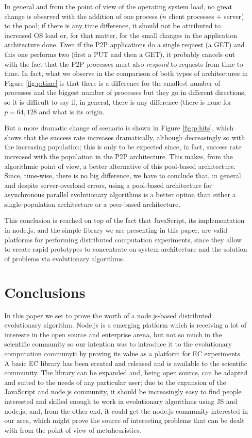 \documentclass{sig-alternate}
\begin{document}
In general and from the point of view of the operating system load, no
great change is observed with the addition of one process ($n$ client
processes + server) to the pool; if there is any time difference, it
should not be attributed to increased OS load or, for that matter, for
the small changes in the application architecture done. Even if the
P2P applications do a single request (a GET) and this one performs two
(first a PUT and then a GET), it probably cancels out with the fact
that the P2P processes must also {\em respond} to requests from time
to time. In fact, what we observe in the comparison of both types of
architectures in Figure \ref{fig:p:time} is that there is a difference
for the smallest number of processes and the biggest number of
processes but they go in different directions, so it is difficult to
say if, in general, there is any difference (there is none for
$p=64,128$ and what is its origin. 

But a more dramatic change of scenario is shown in Figure
\ref{fig:p:hits}, which shows that the success rate increases
dramatically, although decreasingly so with the increasing population;
this is only to be expected since, in fact, success rate increased
with the population in the P2P architecture. This makes, from the
algorithmic point of view, a better alternative of this pool-based
architecture. Since, time-wise, there is no big difference, we have to
conclude that, in general and despite server-overload errors, using a
pool-based architecture for asynchronous parallel evolutionary
algorithms is a better option than either a single-population
architecture or a peer-based architecture. 

This conclusion is reached on top of the fact that JavaScript, its
implementation in node.js, and the simple library we are presenting in
this paper, are valid platforms for performing distributed computation
experiments, since they allow to create rapid prototypes to
concentrate on system architecture and the solution of problems via
evolutionary algorithms. 

\section{Conclusions}

In this paper we set to prove the worth of a node.js-based distributed
evolutionary algorithm. Node.js is a emerging platform which is
receiving a lot of intereste in the open source and enterprise arena,
but not so much in the scientific community so our intention was to
introduce it to the evolutionary computation communyti by proving its
value as a platform for EC experiments. A basic EC library has been
created and released and is available to the scientific community. The
library can be expanded and, being open source, can be adapted and
suited to the needs of any particular user; due to the expansion of
the JavaScript and node.js community, it should be increasingly easy
to find people interested and skilled enough to work in evolutionary
algorithms using JS and node.js, and, from the other end, it could get
the node.js community interested in our area, which might prove the
source of interesting problems that can be dealt with from the point
of view of metaheuristics.
\end{document}
